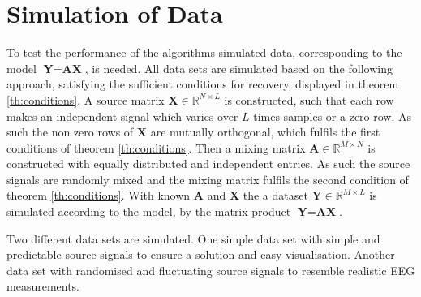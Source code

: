 \section{Simulation of Data}\label{sec:dataset}
To test the performance of the algorithms simulated data, corresponding to the model $\textbf{Y}=\textbf{A}\textbf{X}$, is needed. All data sets are simulated based on the following approach, satisfying the sufficient conditions for recovery, displayed in theorem \ref{th:conditions}. 
A source matrix $\textbf{X}\in \mathbb{R}^{N\times L}$ is constructed, such that each row makes an independent signal which varies over $L$ times samples or a zero row. As such the non zero rows of $\textbf{X}$ are mutually orthogonal, which fulfils the first conditions of theorem \ref{th:conditions}.   
Then a mixing matrix $\textbf{A}\in \mathbb{R}^{M\times N}$ is constructed with equally distributed and independent entries. As such the source signals are randomly mixed and the mixing matrix fulfils the second condition of theorem \ref{th:conditions}.
With known $\textbf{A}$ and $\textbf{X}$ the a dataset $\textbf{Y}\in \mathbb{R}^{M\times L}$ is simulated according to the model, by the matrix product $\textbf{Y}= \textbf{AX}$.  

Two different data sets are simulated.
One simple data set with simple and predictable source signals to ensure a solution and easy visualisation.
Another data set with randomised and fluctuating source signals to resemble realistic EEG measurements.


